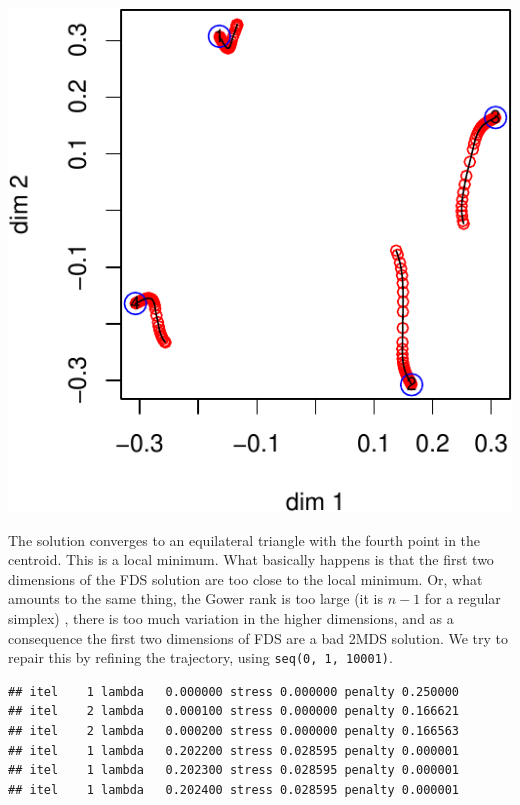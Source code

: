 \documentclass[
  12pt,
]{article}
\begin{document}
\begin{center}\includegraphics{penalty_files/figure-latex/simplex4a-1} \end{center}

The solution converges to an equilateral triangle with the fourth point
in the centroid. This is a local minimum. What basically happens is that
the first two dimensions of the FDS solution are too close to the local
minimum. Or, what amounts to the same thing, the Gower rank is too large
(it is \(n-1\) for a regular simplex) , there is too much variation in
the higher dimensions, and as a consequence the first two dimensions of
FDS are a bad 2MDS solution. We try to repair this by refining the
trajectory, using \texttt{seq(0,\ 1,\ 10001)}.

\begin{verbatim}
## itel    1 lambda   0.000000 stress 0.000000 penalty 0.250000 
## itel    2 lambda   0.000100 stress 0.000000 penalty 0.166621 
## itel    2 lambda   0.000200 stress 0.000000 penalty 0.166563 
## itel    1 lambda   0.202200 stress 0.028595 penalty 0.000001 
## itel    1 lambda   0.202300 stress 0.028595 penalty 0.000001 
## itel    1 lambda   0.202400 stress 0.028595 penalty 0.000001
\end{verbatim}
\end{document}
